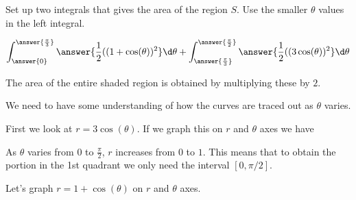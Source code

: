 \documentclass{ximera}
\begin{document}
\begin{exercise}
\begin{multipleChoice}
\end{multipleChoice}


\begin{exercise}

Set up two integrals that gives the area of the region $S$. Use the smaller $\theta$ values in the left integral. 


\[
\int_{\answer{0}}^{\answer{ \frac{\pi}{3} } } \answer{ \frac{1}{2}((1+\cos(\theta))^2   } \d \theta +  \int_{\answer{\frac{\pi}{3}}}^{\answer{\frac{\pi}{2}}} \answer{ \frac{1}{2} ( (3\cos(\theta))^2 } \d \theta
\]

The area of the entire shaded region is obtained by multiplying these by $2$. 


\begin{hint}








We need to have some understanding of how the curves are traced out as $\theta$ varies. 

First we look at $r=3\cos(\theta)$. If we graph this on $r$ and $\theta$ axes we have


\begin{image}  
\end{image} 


As $\theta$ varies from $0$ to $\frac{\pi}{2}$, $r$ increases from $0$ to $1$. This means that to obtain the portion in the 1st quadrant we only need the interval $[0, \pi/2]$. 


Let's graph $r=1+\cos(\theta)$ on $r$ and $\theta$ axes. 


\end{hint}
\end{exercise}
\end{exercise}
\end{document}
